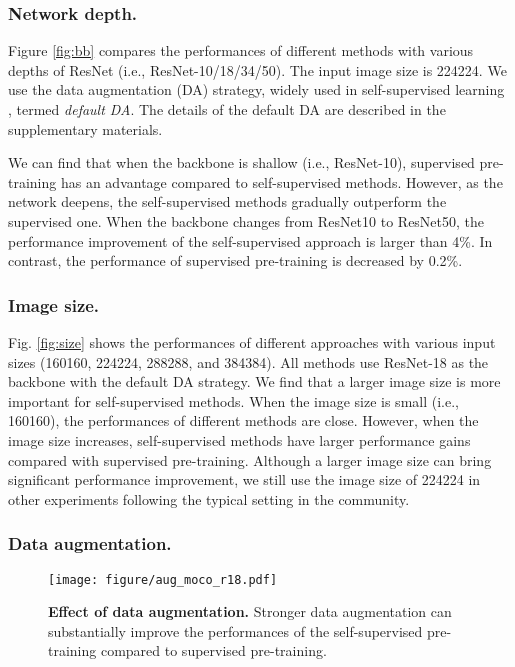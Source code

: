\documentclass[runningheads]{llncs}
\begin{document}
\subsubsection{Network depth.}
Figure \ref{fig:bb} compares the performances of different methods with various depths of ResNet (i.e., ResNet-10/18/34/50). The input image size is 224224. 
We use the data augmentation (DA) strategy, widely used in self-supervised learning \cite{chen2020exploring,chen2020improved}, termed \textit{default DA}.
The details of the default DA are described in the supplementary materials. 

We can find that when the backbone is shallow (i.e., ResNet-10), supervised pre-training has an advantage compared to self-supervised methods.
However, as the network deepens, the self-supervised methods gradually outperform the supervised one.
When the backbone changes from ResNet10 to ResNet50, the performance improvement of the self-supervised approach is larger than 4\%.
In contrast, the performance of supervised pre-training is decreased by 0.2\%.

\subsubsection{Image size.}
Fig. \ref{fig:size} shows the performances of different approaches with various input sizes (160160, 224224, 288288, and 384384). 
All methods use ResNet-18 as the backbone with the default DA strategy. 
We find that a larger image size is more important for self-supervised methods. 
When the image size is small (i.e., 160160), the performances of different methods are close.
However, when the image size increases, self-supervised methods have larger performance gains compared with supervised pre-training.
Although a larger image size can bring significant performance improvement, we still use the image size of 224224 in other experiments following the typical setting in the community.

\subsubsection{Data augmentation.}

\begin{figure}[t]
\centering
\begin{minipage}[c]{0.4\textwidth}
        \texttt{[image: figure/aug\_moco\_r18.pdf]} 
\end{minipage}\hfill
\begin{minipage}[c]{0.55\textwidth}
	\caption{\textbf{Effect of data augmentation.} Stronger data augmentation can substantially improve the performances of the self-supervised pre-training compared to supervised pre-training.} 
	\label{fig:aug}
\end{minipage}
\end{figure}
\end{document}
